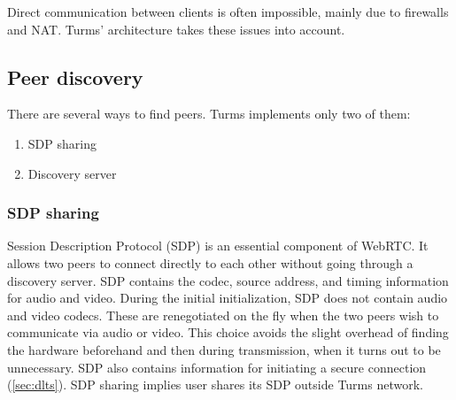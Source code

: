 Direct communication between clients is often impossible, mainly due to 
firewalls and NAT. Turms' architecture takes these issues into account.

\subsection{Peer discovery}

There are several ways to find peers. Turms implements only two of them:
\begin{enumerate}
    \item SDP sharing
    \item Discovery server
\end{enumerate}

\subsubsection{SDP sharing}

Session Description Protocol (SDP) is an essential component of WebRTC.
It allows two peers to connect directly to each other without going through a 
discovery server. SDP contains the codec, source address, and timing 
information for audio and video. During the initial initialization, SDP does 
not contain audio and video codecs. These are renegotiated on the fly when the 
two peers wish to communicate via audio or video. This choice avoids the slight 
overhead of finding the hardware beforehand and then during transmission, when 
it turns out to be unnecessary. SDP also contains information for initiating a 
secure connection (\ref{sec:dlts}).
SDP sharing implies user shares its SDP outside Turms network.
\newpage

